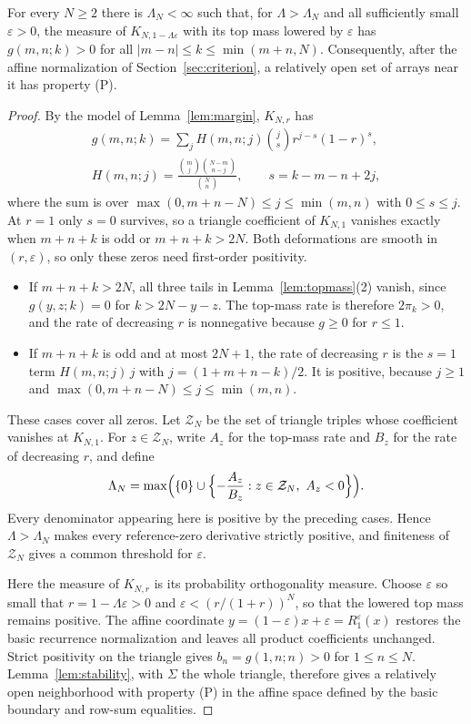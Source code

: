 \begin{proposition}\label{prop:interior}
For every $N\geq2$ there is $\Lambda_N<\infty$ such that, for $\Lambda>\Lambda_N$ and all sufficiently small $\varepsilon>0$, the measure of $K_{N,1-\Lambda\varepsilon}$ with its top mass lowered by $\varepsilon$ has $g(m,n;k)>0$ for all $|m-n|\leq k\leq\min(m+n,N)$. Consequently, after the affine normalization of Section~\ref{sec:criterion}, a relatively open set of arrays near it has property (P).
\end{proposition}
\begin{proof}
By the model of Lemma~\ref{lem:margin}, $K_{N,r}$ has
\begin{gather*}
g(m,n;k)=\sum_jH(m,n;j)\binom js r^{j-s}(1-r)^s,\\
H(m,n;j)=\frac{\binom mj\binom{N-m}{n-j}}{\binom Nn},\qquad s=k-m-n+2j,
\end{gather*}
where the sum is over $\max(0,m+n-N)\leq j\leq\min(m,n)$ with $0\leq s\leq j$.
At $r=1$ only $s=0$ survives, so a triangle coefficient of $K_{N,1}$ vanishes exactly when $m+n+k$ is odd or $m+n+k>2N$. Both deformations are smooth in $(r,\varepsilon)$, so only these zeros need first-order positivity.
\begin{itemize}
\item If $m+n+k>2N$, all three tails in Lemma~\ref{lem:topmass}(2) vanish, since $g(y,z;k)=0$ for $k>2N-y-z$. The top-mass rate is therefore $2\pi_k>0$, and the rate of decreasing $r$ is nonnegative because $g\geq0$ for $r\leq1$.
\item If $m+n+k$ is odd and at most $2N+1$, the rate of decreasing $r$ is the $s=1$ term $H(m,n;j)\,j$ with $j=(1+m+n-k)/2$. It is positive, because $j\geq1$ and $\max(0,m+n-N)\leq j\leq\min(m,n)$.
\end{itemize}
These cases cover all zeros. Let $\mathcal Z_N$ be the set of triangle triples whose coefficient vanishes at $K_{N,1}$. For $z\in\mathcal Z_N$, write $A_z$ for the top-mass rate and $B_z$ for the rate of decreasing $r$, and define
\[
\Lambda_N=\max\Bigl(\{0\}\cup\Bigl\{-\frac{A_z}{B_z}:z\in\mathcal Z_N,\ A_z<0\Bigr\}\Bigr).
\]
Every denominator appearing here is positive by the preceding cases. Hence $\Lambda>\Lambda_N$ makes every reference-zero derivative strictly positive, and finiteness of $\mathcal Z_N$ gives a common threshold for $\varepsilon$.

Here the measure of $K_{N,r}$ is its probability orthogonality measure. Choose $\varepsilon$ so small that $r=1-\Lambda\varepsilon>0$ and $\varepsilon<(r/(1+r))^N$, so that the lowered top mass remains positive. The affine coordinate $y=(1-\varepsilon)x+\varepsilon=R_1^\varepsilon(x)$ restores the basic recurrence normalization and leaves all product coefficients unchanged. Strict positivity on the triangle gives $b_n=g(1,n;n)>0$ for $1\leq n\leq N$. Lemma~\ref{lem:stability}, with $\Sigma$ the whole triangle, therefore gives a relatively open neighborhood with property (P) in the affine space defined by the basic boundary and row-sum equalities.
\end{proof}

